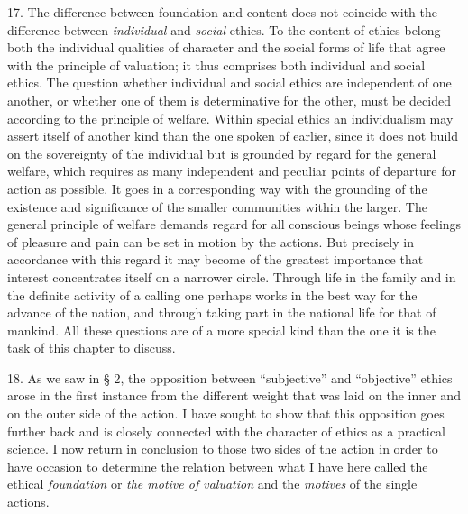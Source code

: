 \documentclass[12pt,a4paper,openany]{book}
\newcommand{\opage}[1]{\marginnote{\footnotesize\textit{[#1]}}}
\begin{document}
17. The difference between foundation and content does not
\opage{60}coincide with the difference between \textit{individual} and \textit{social} ethics. To the content
of ethics belong both the individual qualities of character and the social forms of life that agree
with the principle of valuation; it thus comprises both individual and social ethics. The question
whether individual and social ethics are independent of one another, or whether one of them is
determinative for the other, must be decided according to the principle of welfare. Within special
ethics an individualism may assert itself of another kind than the one spoken of earlier, since it
does not build on the sovereignty of the individual but is grounded by regard for the general welfare,
which requires as many independent and peculiar points of departure for action as possible. It goes
in a corresponding way with the grounding of the existence and significance of the smaller communities
within the larger. The general principle of welfare demands regard for all conscious beings whose
feelings of pleasure and pain can be set in motion by the actions. But precisely in accordance with
this regard it may become of the greatest importance that interest concentrates itself on a narrower
circle. Through life in the family and in the definite activity of a calling one perhaps works in the
best way for the advance of the nation, and through taking part in the national life for that of
mankind. All these questions are of a more special kind than the one it is the task of this chapter
to discuss.

18. As we saw in § 2, the opposition between ``subjective'' and ``objective'' ethics arose in the
first instance from the different weight that was laid on the inner and on the outer side of the
action. I have sought to show that this opposition goes further back and is closely connected with
the character of ethics as a practical science. I now return in conclusion to those two sides of the
action in order to have occasion to determine the relation between what I have here called the
ethical \textit{foundation} or \textit{the motive of valuation} and the \textit{motives} of the single
actions.
\end{document}
